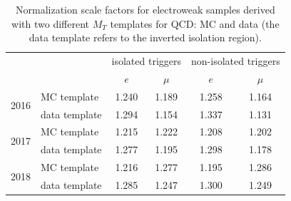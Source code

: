 \begin{table}[htbp]
  \begin{center}
      \small
    {\renewcommand{\arraystretch}{1.3}
      \begin{tabular}{ll|cc|cc}
          \hline
          & & \multicolumn{2}{c|}{isolated triggers} & \multicolumn{2}{c}{non-isolated triggers} \\ %
                    & & $e$ &  $\mu$ & $e$ & $\mu$ \\ \hline
          \multirow{2}{*}{2016} & MC template        & 1.240 & 1.189 & 1.258 & 1.164 \\
                & data template      & 1.294 & 1.154 & 1.337 & 1.131 \\ \hline
          \multirow{2}{*}{2017} & MC  template       & 1.215 & 1.222 & 1.208 & 1.202 \\
                & data template      & 1.277 & 1.195 & 1.298 & 1.178 \\ \hline
          \multirow{2}{*}{2018} & MC  template       & 1.216 & 1.277 & 1.195 & 1.286 \\
                & data template      & 1.285 & 1.247 & 1.300 & 1.249 \\ \hline
      \end{tabular}}
      \caption{Normalization scale factors for electroweak samples derived with two different $M_T$ templates for QCD: MC and data (the data template refers to the inverted isolation region).}
      \label{tab:ewkfits}
  \end{center}
\end{table}

\FloatBarrier

